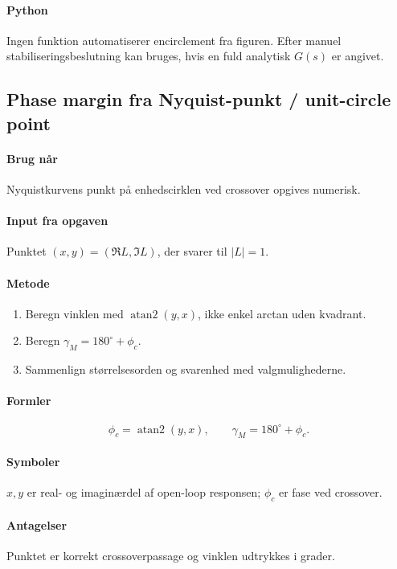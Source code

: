 \paragraph{Python}
Ingen funktion automatiserer encirclement fra figuren. Efter manuel stabiliseringsbeslutning
kan  bruges, hvis en fuld analytisk \(G(s)\) er angivet.

\subsection{Phase margin fra Nyquist-punkt / unit-circle point}

\paragraph{Brug når}
Nyquistkurvens punkt på enhedscirklen ved crossover opgives numerisk.

\paragraph{Input fra opgaven}
Punktet \((x,y)=(\Re L,\Im L)\), der svarer til \(|L|=1\).

\paragraph{Metode}
\begin{enumerate}
\item Beregn vinklen med \(\operatorname{atan2}(y,x)\), ikke enkel arctan uden kvadrant.
\item Beregn \(\gamma_M=180^\circ+\phi_c\).
\item Sammenlign størrelsesorden og svarenhed med valgmulighederne.
\end{enumerate}

\paragraph{Formler}
\[
\phi_c=\operatorname{atan2}(y,x),\qquad \gamma_M=180^\circ+\phi_c .
\]

\paragraph{Symboler}
\(x,y\) er real- og imaginærdel af open-loop responsen; \(\phi_c\) er fase ved crossover.

\paragraph{Antagelser}
Punktet er korrekt crossoverpassage og vinklen udtrykkes i grader.

